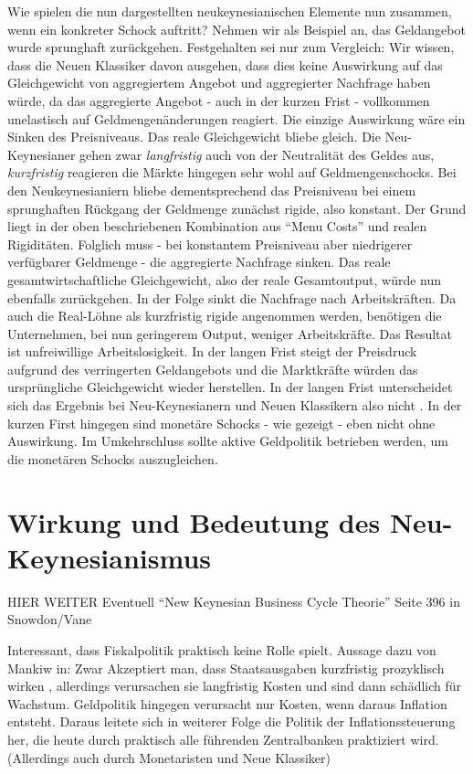 Wie spielen die nun dargestellten neukeynesianischen Elemente nun zusammen, wenn ein konkreter Schock auftritt? Nehmen wir als Beispiel an, das Geldangebot wurde sprunghaft zurückgehen. Festgehalten sei nur zum Vergleich: Wir wissen, dass die Neuen Klassiker davon ausgehen, dass dies keine Auswirkung auf das Gleichgewicht von aggregiertem Angebot und aggregierter Nachfrage haben würde, da das aggregierte Angebot - auch in der kurzen Frist - vollkommen unelastisch auf Geldmengenänderungen reagiert. Die einzige Auswirkung wäre ein Sinken des Preisniveaus. Das reale Gleichgewicht bliebe gleich. Die Neu-Keynesianer gehen zwar \textit{langfristig} auch von der Neutralität des Geldes aus, \textit{kurzfristig} reagieren die Märkte hingegen sehr wohl auf Geldmengenschocks. Bei den Neukeynesianiern bliebe dementsprechend das Preisniveau bei einem sprunghaften Rückgang der Geldmenge zunächst rigide, also konstant. Der Grund liegt in der oben beschriebenen Kombination aus "`Menu Costs"' und realen Rigiditäten. Folglich muss - bei konstantem Preisniveau aber niedrigerer verfügbarer Geldmenge - die aggregierte Nachfrage sinken. Das reale gesamtwirtschaftliche Gleichgewicht, also der reale Gesamtoutput, würde nun ebenfalls zurückgehen. In der Folge sinkt die Nachfrage nach Arbeitskräften. Da auch die Real-Löhne als kurzfristig rigide angenommen werden, benötigen die Unternehmen, bei nun geringerem Output, weniger Arbeitskräfte. Das Resultat ist unfreiwillige Arbeitslosigkeit. In der langen Frist steigt der Preisdruck aufgrund des verringerten Geldangebots und die Marktkräfte würden das ursprüngliche Gleichgewicht wieder herstellen. In der langen Frist unterscheidet sich das Ergebnis bei Neu-Keynesianern und Neuen Klassikern also nicht \parencite[S. 398]{Snowdon2005}. In der kurzen First hingegen sind monetäre Schocks - wie gezeigt - eben nicht ohne Auswirkung. Im Umkehrschluss sollte aktive Geldpolitik betrieben werden, um die monetären Schocks auszugleichen.

\section{Wirkung und Bedeutung des Neu-Keynesianismus}

HIER WEITER
Eventuell "`New Keynesian Business Cycle Theorie"' Seite 396 in Snowdon/Vane

Interessant, dass Fiskalpolitik praktisch keine Rolle spielt. Aussage dazu von Mankiw in: \parencite[S. 446]{Snowdon2005} Zwar Akzeptiert man, dass Staatsausgaben kurzfristig prozyklisch wirken \parencite[S. 408]{Snowdon2005}, allerdings verursachen sie langfristig Kosten und sind dann schädlich für Wachstum. Geldpolitik hingegen verursacht nur Kosten, wenn daraus Inflation entsteht. Daraus leitete sich in weiterer Folge \parencite[S. 413]{Snowdon2005} die Politik der Inflationssteuerung her, die heute durch praktisch alle führenden Zentralbanken praktiziert wird. (Allerdings auch durch Monetaristen und Neue Klassiker)

